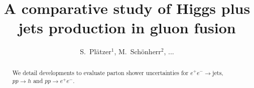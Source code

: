 \documentclass[11pt]{cernrep}
\begin{document}
\title{A comparative study of Higgs plus jets production in gluon fusion}

\author{
  S.\ Pl\"atzer$^1$,
  M.\ Sch\"onherr$^2$,
  ...
}

\maketitle

\begin{abstract}
  We detail developments to evaluate parton shower uncertainties 
  for $e^+e^-\to\text{jets}$, $pp\to h$ and $pp\to e^+e^-$.
\end{abstract}






\end{document}
